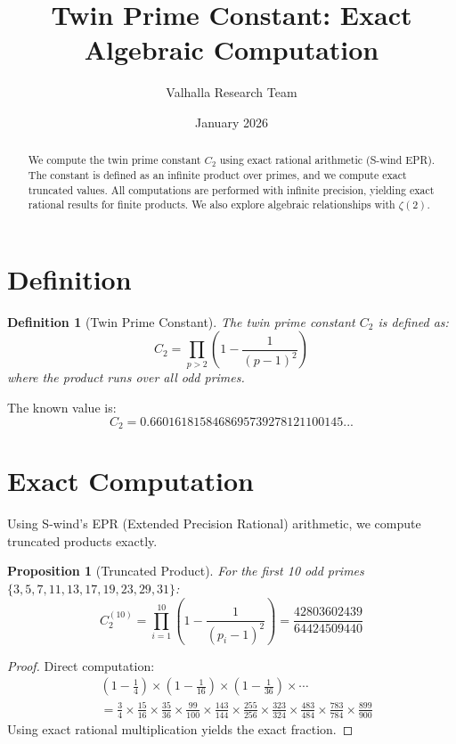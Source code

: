 \documentclass[11pt,a4paper]{article}
\title{Twin Prime Constant: Exact Algebraic Computation}
\author{Valhalla Research Team}
\date{January 2026}
\newtheorem{definition}{Definition}
\newtheorem{proposition}{Proposition}
\begin{document}
\maketitle

\begin{abstract}
We compute the twin prime constant $C_2$ using exact rational arithmetic (S-wind EPR). The constant is defined as an infinite product over primes, and we compute exact truncated values. All computations are performed with infinite precision, yielding exact rational results for finite products. We also explore algebraic relationships with $\zeta(2)$.
\end{abstract}

\section{Definition}

\begin{definition}[Twin Prime Constant]
The twin prime constant $C_2$ is defined as:
\begin{equation}
C_2 = \prod_{p > 2} \left(1 - \frac{1}{(p-1)^2}\right)
\end{equation}
where the product runs over all odd primes.
\end{definition}

The known value is:
\begin{equation}
C_2 = 0.6601618158468695739278121100145...
\end{equation}

\section{Exact Computation}

Using S-wind's EPR (Extended Precision Rational) arithmetic, we compute truncated products exactly.

\begin{proposition}[Truncated Product]
For the first 10 odd primes $\{3, 5, 7, 11, 13, 17, 19, 23, 29, 31\}$:
\begin{equation}
C_2^{(10)} = \prod_{i=1}^{10} \left(1 - \frac{1}{(p_i - 1)^2}\right) = \frac{42803602439}{64424509440}
\end{equation}
\end{proposition}

\begin{proof}
Direct computation:
\begin{align}
&\left(1 - \frac{1}{4}\right) \times \left(1 - \frac{1}{16}\right) \times \left(1 - \frac{1}{36}\right) \times \cdots \\
&= \frac{3}{4} \times \frac{15}{16} \times \frac{35}{36} \times \frac{99}{100} \times \frac{143}{144} \times \frac{255}{256} \times \frac{323}{324} \times \frac{483}{484} \times \frac{783}{784} \times \frac{899}{900}
\end{align}
Using exact rational multiplication yields the exact fraction.
\end{proof}
\end{document}
